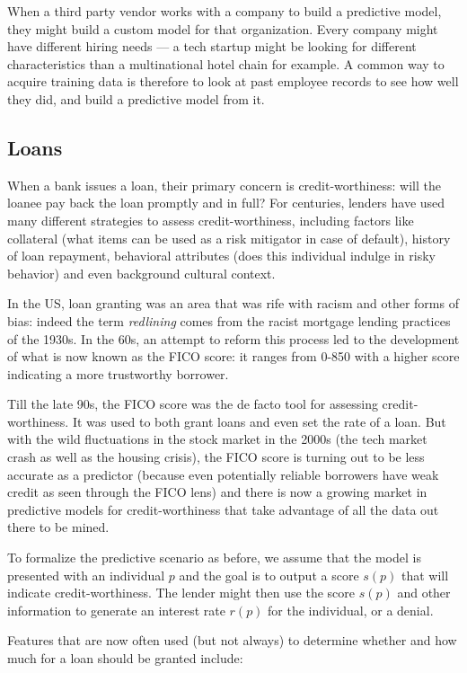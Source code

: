 \documentclass[11pt]{paper}
\begin{document}
When a third party vendor works with a company to build a predictive
model, they might build a custom model for that organization. Every
company might have different hiring needs --- a tech startup might be
looking for different characteristics than a multinational hotel chain
for example. A common way to acquire training data is therefore to look
at past employee records to see how well they did, and build a
predictive model from it.

\subsection{Loans}\label{loans}

When a bank issues a loan, their primary concern is credit-worthiness:
will the loanee pay back the loan promptly and in full? For centuries,
lenders have used many different strategies to assess credit-worthiness,
including factors like collateral (what items can be used as a risk
mitigator in case of default), history of loan repayment, behavioral
attributes (does this individual indulge in risky behavior) and even
background cultural context.

In the US, loan granting was an area that was rife with racism and other
forms of bias: indeed the term \emph{redlining} comes from the racist
mortgage lending practices of the 1930s. In the 60s, an attempt to
reform this process led to the development of what is now known as the
FICO score: it ranges from 0-850 with a higher score indicating a more
trustworthy borrower.

Till the late 90s, the FICO score was the de facto tool for assessing
credit-worthiness. It was used to both grant loans and even set the rate
of a loan. But with the wild fluctuations in the stock market in the
2000s (the tech market crash as well as the housing crisis), the FICO
score is turning out to be less accurate as a predictor (because even
potentially reliable borrowers have weak credit as seen through the FICO
lens) and there is now a growing market in predictive models for
credit-worthiness that take advantage of all the data out there to be
mined.

To formalize the predictive scenario as before, we assume that the model
is presented with an individual $p$ and the goal is to output a score
$s(p)$ that will indicate credit-worthiness. The lender might then use
the score $s(p)$ and other information to generate an interest rate
$r(p)$ for the individual, or a denial.

Features that are now often used (but not always) to determine whether
and how much for a loan should be granted include:
\end{document}
